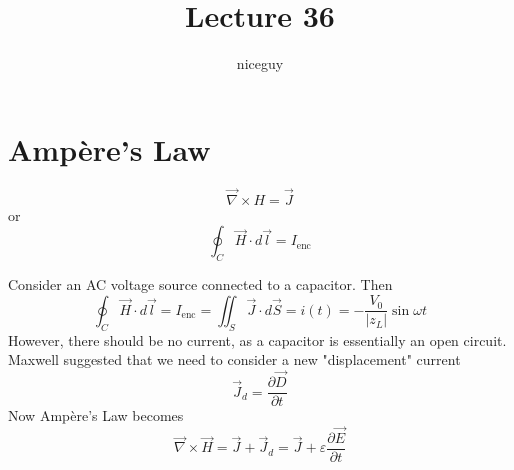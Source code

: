 \documentclass[12pt]{article}
\author{niceguy}
\title{Lecture 36}
\begin{document}
\maketitle

\section{Amp\`ere's Law}

$$\vec \nabla \times H = \vec J$$
or
$$\oint_C \vec H \cdot d\vec l = I_{\text{enc}}$$

Consider an AC voltage source connected to a capacitor. Then
$$\oint_C \vec H \cdot d\vec l = I_{\text{enc}} = \iint_S \vec J \cdot d\vec S = i(t) = -\frac{V_0}{|z_L|}\sin\omega t$$
However, there should be no current, as a capacitor is essentially an open circuit. Maxwell suggested that we need to consider a new "displacement" current
$$\vec J_d = \frac{\partial \vec D}{\partial t}$$
Now Amp\`ere's Law becomes
$$\vec\nabla \times \vec H = \vec J + \vec J_d = \vec J + \varepsilon\frac{\partial \vec E}{\partial t}$$
\end{document}
